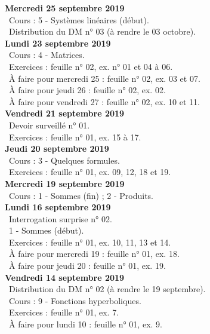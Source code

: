 \documentclass[12pt,a4paper]{article}
\begin{document}
 \noindent\textbf{\bf Mercredi 25 septembre 2019}\\
 \bu\ Cours : 5 - Systèmes linéaires (début).\\
 \bu\ Distribution du DM n° 03 (à rendre le 03 octobre).\\
 
 \noindent\textbf{\bf Lundi 23 septembre 2019}\\
 \bu\ Cours : 4 - Matrices.\\
 \bu\ Exercices : feuille n° 02, ex. n° 01 et 04 à 06.\\
 \bu\ À faire pour mercredi 25 : feuille n° 02, ex. 03 et 07.\\
 \bu\ À faire pour jeudi 26 : feuille n° 02, ex. 02.\\
 \bu\ À faire pour vendredi 27 : feuille n° 02, ex. 10 et 11.\vspace{.4cm}\\ 
 
 \noindent\textbf{Vendredi 21 septembre 2019}\\
 \bu\ Devoir surveillé n° 01.\\
 \bu\ Exercices : feuille n° 01, ex. 15 à 17.\vspace{.4cm}\\
  
 \noindent\textbf{Jeudi 20 septembre 2019}\\
 \bu\ Cours : 3 - Quelques formules.\\
 \bu\ Exercices : feuille n° 01, ex. 09, 12, 18 et 19.\vspace{.4cm}\\
 
 \noindent\textbf{\bf Mercredi 19 septembre 2019}\\
 \bu\ Cours : 1 - Sommes (fin) ; 2 - Produits.\vspace{.4cm}\\
 
 \noindent\textbf{\bf Lundi 16 septembre 2019}\\ 
 \bu\ Interrogation surprise n° 02.\\
 \bu\ 1 - Sommes (début).\\
 \bu\ Exercices : feuille n° 01, ex. 10, 11, 13 et 14.\\
 \bu\ À faire pour mercredi 19 : feuille n° 01, ex. 18.\\
 \bu\ À faire pour jeudi 20 : feuille n° 01, ex. 19.\vspace{.4cm}\\
 
 \noindent\textbf{Vendredi 14 septembre 2019}\\
 \bu\ Distribution du DM n° 02 (à rendre le 19 septembre).\\
 \bu\ Cours : 9 - Fonctions hyperboliques.\\
 \bu\ Exercices : feuille n° 01, ex. 7.\\
 \bu\ À faire pour lundi 10 : feuille n° 01, ex. 9.\vspace{.4cm}\\
 
\end{document}
